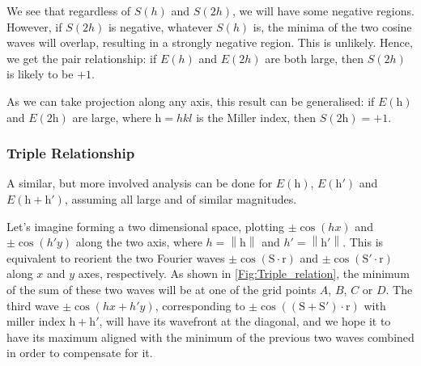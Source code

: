 \documentclass{article}
\theoremstyle{plain}\theoremheaderfont{\normalfont\itshape}\theorembodyfont{\rmfamily}\theoremseparator{.}\newtheorem*{rem}{Remark}\newtheorem*{ex}{Example}\newtheorem*{proof}{Proof}\newtheorem*{altp}{Alternative proof}
\theoremstyle{plain}\theoremheaderfont{\normalfont\bfseries}\theorembodyfont{\rmfamily}\theoremseparator{.}\newtheorem{thm}{Theorem}[section]\newtheorem{lem}[thm]{Lemma}\newtheorem{prop}[thm]{Proposition}\newtheorem*{cor}{Corollary}\newtheorem{defn}[thm]{Definition}\newtheorem{clm}[thm]{Claim}\newtheorem{clminproof}{Claim}\newtheorem*{law}{Law}\newtheorem{pos}[thm]{Postulate}
\theoremstyle{break}\theoremheaderfont{\normalfont\itshape}\theorembodyfont{\rmfamily}\theoremseparator{.\medskip}\newtheorem*{proofskip}{Proof}\newtheorem*{exs}{Examples}\newtheorem*{rems}{Remarks}
\theoremstyle{break}\theoremheaderfont{\normalfont\bfseries}\theorembodyfont{\rmfamily}\theoremseparator{.\medskip}\newtheorem{lemskip}[thm]{Lemma}\newtheorem{defnskip}[thm]{Definition}\newtheorem{propskip}[thm]{Proposition}\newtheorem{thmskip}[thm]{Theorem}
\numberwithin{equation}{section}
\newcommand{\vb}[1]{\bm{\mathrm{#1}}}
\newcommand{\vdot}{\,\bm{\mathrm{\cdot}}\,}
\newcommand{\norm}[1]{\left\| #1 \right\|}
\begin{document}
    We see that regardless of \(S(h)\) and \(S(2h)\), we will have some negative regions. However, if \(S(2h)\) is negative, whatever \(S(h)\) is, the minima of the two cosine waves will overlap, resulting in a strongly negative region. This is unlikely. Hence, we get the pair relationship: if \(E(h)\) and \(E(2h)\) are both large, then \(S(2h)\) is likely to be \(+1\).

    As we can take projection along any axis, this result can be generalised: if \(E(\vb{h})\) and \(E(2\vb{h})\) are large, where \(\vb{h}=hkl\) is the Miller index, then \(S(2\vb{h})=+1\).

    \subsubsection{Triple Relationship}
    A similar, but more involved analysis can be done for \(E(\vb{h})\), \(E(\vb{h}')\) and \(E(\vb{h}+\vb{h}')\), assuming all large and of similar magnitudes.

    Let's imagine forming a two dimensional space, plotting \(\pm\cos(hx)\) and \(\pm\cos(h'y)\) along the two axis, where \(h=\norm{\vb{h}}\) and \(h'=\norm{\vb{h}'}\). This is equivalent to reorient the two Fourier waves \(\pm \cos(\vb{S}\vdot\vb{r})\) and \(\pm \cos(\vb{S}'\vdot\vb{r})\) along \(x\) and \(y\) axes, respectively. As shown in \cref{Fig:Triple_relation}, the minimum of the sum of these two waves will be at one of the grid points \(A\), \(B\), \(C\) or \(D\). The third wave \(\pm\cos(hx+h'y)\), corresponding to \(\pm\cos((\vb{S}+\vb{S}')\vdot\vb{r})\) with miller index \(\vb{h}+\vb{h}'\), will have its wavefront at the diagonal, and we hope it to have its maximum aligned with the minimum of the previous two waves combined in order to compensate for it.
\end{document}
